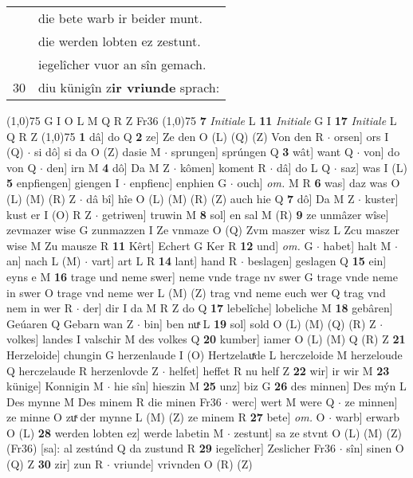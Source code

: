 \documentclass[8pt,a4paper,notitlepage]{article}
\begin{document}
\begin{table}[ht]
\begin{minipage}[t]{0.5\linewidth}
\begin{tabular}{rl}
 & die bete warb ir beider munt.\\ 
 & die werden lobten ez zestunt.\\ 
 & iegelîcher vuor an sîn gemach.\\ 
30 & diu künigîn z\textbf{ir vriunde} sprach:\\ 
\end{tabular}
\scriptsize
\line(1,0){75} \newline
G I O L M Q R Z Fr36 \newline
\line(1,0){75} \newline
\textbf{7} \textit{Initiale} L  \textbf{11} \textit{Initiale} G I  \textbf{17} \textit{Initiale} L Q R Z  \newline
\line(1,0){75} \newline
\textbf{1} dâ] do Q \textbf{2} ze] Ze den O (L) (Q) (Z) Von den R  $\cdot$ orsen] ors I (Q)  $\cdot$ si dô] si da O (Z) dasie M  $\cdot$ sprungen] sprúngen Q \textbf{3} wât] want Q  $\cdot$ von] do von Q  $\cdot$ den] irn M \textbf{4} dô] Da M Z  $\cdot$ kômen] koment R  $\cdot$ dâ] do L Q  $\cdot$ saz] was I (L) \textbf{5} enpfiengen] giengen I  $\cdot$ enpfienc] enphien G  $\cdot$ ouch] \textit{om.} M R \textbf{6} was] daz was O (L) (M) (R) Z  $\cdot$ dâ bî] hîe O (L) (M) (R) (Z) auch hie Q \textbf{7} dô] Da M Z  $\cdot$ kuster] kust er I (O) R Z  $\cdot$ getriwen] truwin M \textbf{8} sol] en sal M (R) \textbf{9} ze unmâzer wîse] zevmazer wise G zunmazzen I Ze vnmaze O (Q) Zvm maszer wisz L Zcu maszer wise M Zu mausze R \textbf{11} Kêrt] Echert G Ker R \textbf{12} und] \textit{om.} G  $\cdot$ habet] halt M  $\cdot$ an] nach L (M)  $\cdot$ vart] art L R \textbf{14} lant] hand R  $\cdot$ beslagen] geslagen Q \textbf{15} ein] eyns e M \textbf{16} trage und neme swer] neme vnde trage nv swer G trage vnde neme in swer O trage vnd neme wer L (M) (Z) trag vnd neme euch wer Q trag vnd nem in wer R  $\cdot$ der] dir I da M R Z do Q \textbf{17} lebelîche] lobeliche M \textbf{18} gebâren] Geúaren Q Gebarn wan Z  $\cdot$ bin] ben nuͯ L \textbf{19} sol] sold O (L) (M) (Q) (R) Z  $\cdot$ volkes] landes I valschir M des volkes Q \textbf{20} kumber] iamer O (L) (M) Q (R) Z \textbf{21} Herzeloide] chungin G herzenlaude I (O) Hertzelauͯde L herczeloide M herzeloude Q herczelaude R herzenlovde Z  $\cdot$ helfet] heffet R nu helf Z \textbf{22} wir] ir wir M \textbf{23} künige] Konnigin M  $\cdot$ hie sîn] hieszin M \textbf{25} unz] biz G \textbf{26} des minnen] Des mýn L Des mynne M Des minem R die minen Fr36  $\cdot$ werc] wert M were Q  $\cdot$ ze minnen] ze minne O zuͯ der mynne L (M) (Z) ze minem R \textbf{27} bete] \textit{om.} O  $\cdot$ warb] erwarb O (L) \textbf{28} werden lobten ez] werde labetin M  $\cdot$ zestunt] sa ze stvnt O (L) (M) (Z) (Fr36) [sa]: al zestúnd Q da zustund R \textbf{29} iegelîcher] Zeslicher Fr36  $\cdot$ sîn] sinen O (Q) Z \textbf{30} zir] zun R  $\cdot$ vriunde] vrivnden O (R) (Z) \newline

\end{minipage}
\end{table}
\end{document}
